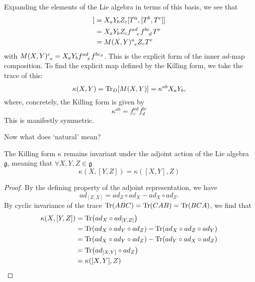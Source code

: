 Expanding the elements of the Lie algebra in terms of this basis, we see that
\begin{align}
  [X, [Y, Z]] &= X_a Y_b Z_c [T^a, [T^b, T^c]] \\
	      &= X_a Y_b Z_c f \indices{^{ad}_e} f \indices{^{bc}_d} T^e \\
	      &= M(X, Y) \indices{^a_e} Z_c T^e
\end{align}
with $M(X, Y) \indices{^c_e} = X_a Y_b f \indices{^{ad}_e} f^{bc_d}$. This is the explicit form of the inner $ad$-map composition.
To find the explicit map defined by the Killing form, we take the trace of this:
\begin{equation}
  \kappa(X, Y) = \Tr_D [M(X, Y)] = \kappa^{ab} X_a Y_b,
\end{equation}
where, concretely, the Killing form is given by
\begin{equation}
  \boxed{\kappa^{ab} = f^{ad}_c f^{bc}_d}
\end{equation}
This is manifestly symmetric.

Now what does `natural' mean? 
\begin{claim}
  The Killing form $\kappa$ remains invariant under the adjoint action of the Lie algebra $\mathfrak{g}$, meaning that $\forall X, Y, Z \in \mathfrak{g}$
  \begin{equation}
    \label{eq:killing-invariance}
    \kappa(X, [Y, Z]) = \kappa([X, Y], Z)
  \end{equation}
\end{claim}
\begin{proof}
  By the defining property of the adjoint representation, we have
  \begin{equation}
    ad_{[Z, X]} = ad_Z \circ ad_X - ad_X \circ ad_Z.
  \end{equation}
  By cyclic invariance of the trace $\Tr(ABC) = \Tr(CAB) = \Tr(BCA)$, we find that
  \begin{align}
    \kappa(X, [Y, Z]) &= \Tr(ad_X \circ ad_{[Y, Z]}) \\
		      &= \Tr(ad_X \circ ad_Y \circ ad_Z) - \Tr(ad_X \circ ad_Z \circ ad_Y) \\
		      &= \Tr(ad_X \circ ad_Y \circ ad_Z) - \Tr(ad_Y \circ ad_X \circ ad_Z) \\
		      &= \Tr(ad_{[X, Y]} \circ ad_Z) \\
		      &= \kappa([X, Y], Z)
  \end{align}
\end{proof}
